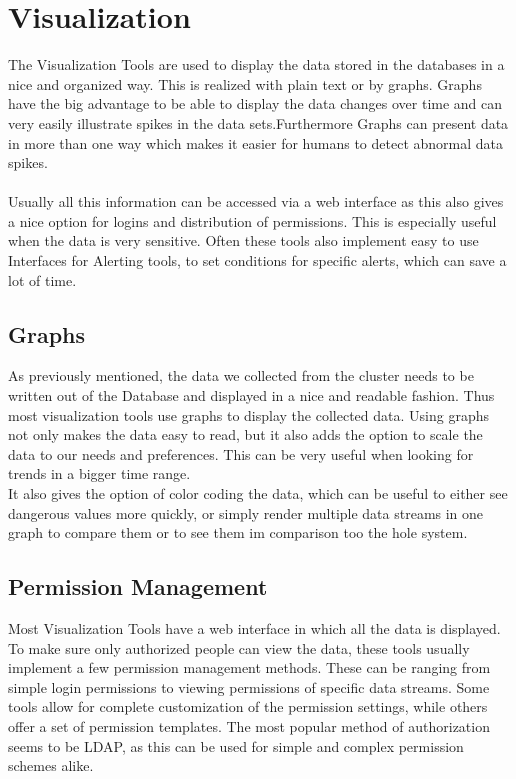 \section{Visualization} 
The Visualization Tools are used to display the data stored in the databases in a nice and organized way. This is realized with plain text or by graphs. Graphs have the big advantage to be able to display the data changes over time and can very easily illustrate spikes in the data sets.Furthermore Graphs can present data in more than one way which makes it easier for humans to detect abnormal data spikes.\\
\\ 
Usually all this information can be accessed via a web interface as this also gives a nice option for logins and distribution of permissions. This is especially useful when the data is very sensitive.
Often these tools also implement easy to use Interfaces for Alerting tools, to set conditions for specific alerts, which can save a lot of time.

\subsection{Graphs}
As previously mentioned, the data we collected from the cluster needs to be written out of the Database and displayed in a nice and readable fashion. Thus most visualization tools use graphs to display the collected data. 
Using graphs not only makes the data easy to read, but it also adds the option to scale the data to our needs and preferences. This can be very useful when looking for trends in a bigger time range.\\
It also gives the option of color coding the data, which can be useful to either see dangerous values more quickly, or simply render multiple data streams in one graph to compare them or to see them im comparison too the hole system.
\subsection{Permission Management}
Most Visualization Tools have a web interface in which all the data is displayed. To make sure only authorized people can view the data, these tools usually implement a few permission management methods. 
These can be ranging from simple login permissions to viewing permissions of specific data streams. Some tools allow for complete customization of the permission settings, while others offer a set of permission templates. The most popular method of authorization seems to be LDAP, as this can be used for simple and complex permission schemes alike. 
